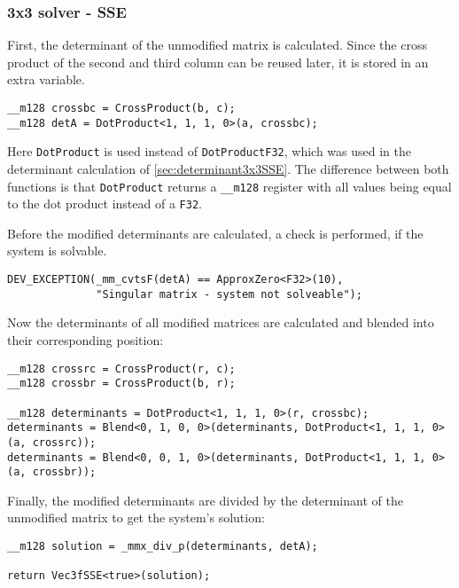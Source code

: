 \subsubsection{3x3 solver - SSE}
\label{sec:cramerSolver3x3SSE}

First, the determinant of the unmodified matrix is calculated. Since the cross product of the second and third column can be reused later, it is stored in an extra variable.

\begin{verbatim}
__m128 crossbc = CrossProduct(b, c);
__m128 detA = DotProduct<1, 1, 1, 0>(a, crossbc);
\end{verbatim}

Here \texttt{DotProduct} is used instead of \texttt{DotProductF32}, which was used in the determinant calculation of \cref{sec:determinant3x3SSE}. 
The difference between both functions is that \texttt{DotProduct} returns a \texttt{__m128} register with all values being equal to the dot product instead of a \texttt{F32}.

Before the modified determinants are calculated, a check is performed, if the system is solvable.

\begin{verbatim}
DEV_EXCEPTION(_mm_cvtsF(detA) == ApproxZero<F32>(10), 
              "Singular matrix - system not solveable");
\end{verbatim}

Now the determinants of all modified matrices are calculated and blended into their corresponding position:

\begin{verbatim}
__m128 crossrc = CrossProduct(r, c);
__m128 crossbr = CrossProduct(b, r);

__m128 determinants = DotProduct<1, 1, 1, 0>(r, crossbc);
determinants = Blend<0, 1, 0, 0>(determinants, DotProduct<1, 1, 1, 0>(a, crossrc));
determinants = Blend<0, 0, 1, 0>(determinants, DotProduct<1, 1, 1, 0>(a, crossbr));
\end{verbatim}

Finally, the modified determinants are divided by the determinant of the unmodified matrix to get the system's solution:

\begin{verbatim}
__m128 solution = _mmx_div_p(determinants, detA);

return Vec3fSSE<true>(solution);
\end{verbatim}


